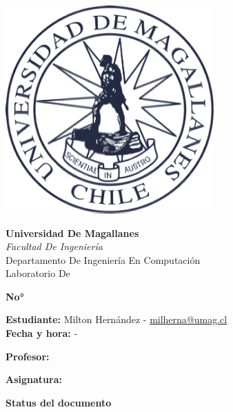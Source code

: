 \begin{titlepage}
    \centering
    \begin{center}
        \begin{minipage}[c]{0.3\textwidth}
            \centering
            \includegraphics[width=0.6\textwidth]{src/images/logoUmag.png}
        \end{minipage}\hfill
        \begin{minipage}[c]{0.7\textwidth}
            \centering
            \textbf{Universidad De Magallanes}\\
            \textit{Facultad De Ingeniería}\\
            Departamento De Ingeniería En Computación\\
            Laboratorio De \docsubject\\
        \end{minipage}
    \end{center}
    \vspace{0.2cm}
    {\LARGE\bfseries\doctype No° \docnumber\par}
    {\large \doctitle \par}
    \vspace{1.5cm}
    {\large \textbf{Estudiante:} Milton Hernández - \href{mailto:milherna@umag.cl}{milherna@umag.cl}}\\
    \vspace{0.3cm}
    \textbf{Fecha y hora:} {\docdate - \doctime} \\
    \vspace{0.3cm}
    {\large \textbf{Profesor:} \docprofessor \par}
    \vspace{0.3cm}
    {\large \textbf{Asignatura:} \docsubject \par}
    \vspace{1.5cm}
    {\LARGE\bfseries Status del documento \par}
    
    \vfill
\end{titlepage}